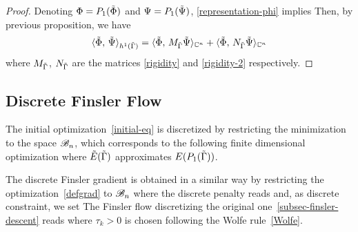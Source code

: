 \begin{proof}  Denoting $\Phi=P_1(\tilde{\Phi})$ and $\Psi=P_1(\tilde{\Psi})$, \eqref{representation-phi} implies 
Then, by previous proposition, we have 
$$
	\langle \tilde{\Phi},\,\tilde{\Psi}\rangle_{h^1(\tilde{\Gamma})} 
	= \langle \tilde{\Phi},\,M_{\tilde{\Gamma}} \tilde{\Psi}\rangle_{\mathbb{C}^n}	 
	+ \langle \tilde{\Phi},\,N_{\tilde{\Gamma}}  \tilde{\Psi}\rangle_{\mathbb{C}^n}
$$
where $M_{\tilde{\Gamma}}$, $N_{\tilde{\Gamma}}$  are the   matrices \eqref{rigidity} and \eqref{rigidity-2} respectively. 
 
\end{proof}

\subsection{Discrete Finsler Flow}

The initial optimization~\eqref{initial-eq} is discretized by restricting the minimization to the space $\mathcal{B}_n$, which corresponds to the following finite dimensional optimization
where $\tilde E(\tilde{\Gamma})$ approximates $E(P_1(\tilde{\Gamma}))$.

The discrete Finsler gradient is obtained in a similar way by restricting the optimization~\eqref{defgrad} to $\mathcal{B}_n$
\eql{\label{eq-finsler-grad-discr}
	\nabla_{\tR_{\tGa}} \tE(\tGa) \in 
	\uargmin{\tPhi \in \tilde\Ll_{\tGa}} \tR_{\tGa}(\tPhi)~, 
}
where the discrete penalty  reads
and, as discrete constraint, we set 
The Finsler flow discretizing the original one~\eqref{subsec-finsler-descent} reads
where $\tau_k>0$ is chosen following the Wolfe rule~\eqref{Wolfe}.

